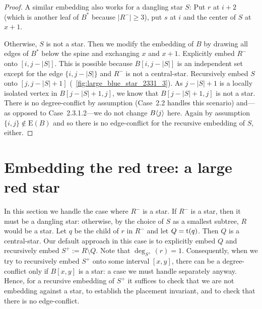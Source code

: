 \documentclass[11pt,a4paper,colorlinks=true,urlcolor=blue,citecolor=red]{article}
\theoremstyle{plain}
\newcommand{\EB}{\mathrm{E}(B)}
\begin{document}
\begin{proof}
  A similar embedding also works for a dangling star $S$: Put $r$ at
  $i+2$ (which is another leaf of $B^*$ because $|R^-|\ge 3$), put $s$
  at $i$ and the center of $S$ at $x+1$.

  Otherwise, $S$ is not a star. Then we modify the embedding of $B$ by
  drawing all edges of $B^*$ below the spine and exchanging $x$ and
  $x+1$. Explicitly embed $R^-$ onto $[i,j-|S|]$. This is possible
  because $B[i,j-|S|]$ is an independent set except for the edge
  $\{i,j-|S|\}$ and $R^-$ is not a central-star. Recursively embed $S$
  onto $[j,j-|S|+1]$ (\figurename~\ref{fig:large_blue_star_2331_3}). As
  $j-|S|+1$ is a locally isolated vertex in $B[j-|S|+1,j]$, we know that
  $B[j-|S|+1,j]$ is not a star. There is no degree-conflict by
  assumption (Case~2.2 handles this scenario) and---as opposed to
  Case~2.3.1.2---we do not change $B\langle{j}\rangle$ here. Again by assumption
  $\{i,j\}\notin\EB$ and so there is no edge-conflict for the
  recursive embedding of $S$, either.
\end{proof}

\section{Embedding the red tree: a large red star}
\label{subsec:rec_large_red_star}
In this section we handle the case where $R^-$ is a star. If $R^-$ is a
star, then it must be a dangling star: otherwise, by the choice of $S$
as a smallest subtree, $R$ would be a star. Let $q$ be the child of $r$
in $R^-$ and let $Q=\mathrm t(q)$. Then $Q$ is a central-star. Our default
approach in this case is to explicitly embed $Q$ and recursively embed
$S^+:=R\setminus Q$. Note that $\deg_{S^+}(r)=1$. Consequently, when we
try to recursively embed $S^+$ onto some interval $[x,y]$, there can be
a degree-conflict only if $B[x,y]$ is a star: a case we must handle
separately anyway. Hence, for a recursive embedding of $S^+$ it suffices
to check that we are not embedding against a star, to establish the
placement invariant, and to check that there is no edge-conflict.
\end{document}
